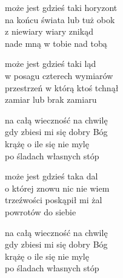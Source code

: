 \begin{text}
    może jest gdzieś taki horyzont\\
    na końcu świata lub tuż obok\\
    z niewiary wiary znikąd\\
    nade mną w tobie nad tobą

    może jest gdzieś taki ląd\\
    w posagu czterech wymiarów\\
    przestrzeń w którą ktoś tchnął\\
    zamiar lub brak zamiaru

    na całą wieczność na chwilę\\
    gdy zbiesi mi się dobry Bóg\\
    krążę o ile się nie mylę\\
    po śladach własnych stóp

    może jest gdzieś taka dal\\
    o której znowu nic nie wiem\\
    trzeźwości poskąpił mi żal\\
    powrotów do siebie

    na całą wieczność na chwilę\\
    gdy zbiesi mi się dobry Bóg\\
    krążę o ile się nie mylę\\
    po śladach własnych stóp
\end{text}
\begin{chord}

\end{chord}